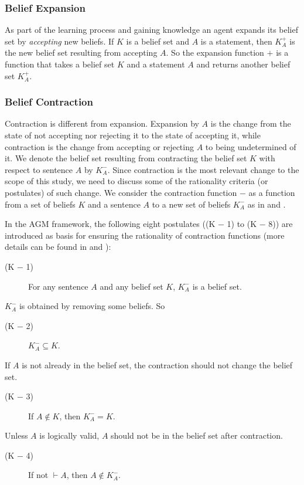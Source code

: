 \subsubsection{Belief Expansion}
As part of the learning process and gaining knowledge an agent expands its belief set by \textit{accepting} new beliefs. If $K$ is a belief set and $A$ is a statement, then $K^{+}_{A}$ is the new belief set resulting from accepting $A$. So the expansion function $+$ is a function that takes a belief set $K$ and a statement $A$ and returns another belief set $K^{+}_{A}$. 

\subsubsection{Belief Contraction}
Contraction is different from expansion. Expansion by $A$ is the change from the state of not accepting nor rejecting it to the state of accepting it, while contraction is the change from accepting or rejecting $A$ to being undetermined of it. We denote the belief set resulting from contracting the belief set $K$ with respect to sentence $A$ by $K^{-}_{A}$. Since contraction is the most relevant change to the scope of this study, we need to discuss some of the rationality criteria (or postulates) of such change. We consider the contraction function $-$ as a function from a set of beliefs $K$ and a sentence $A$ to a new set of beliefs $K^{-}_{A}$ as in \cite{flux} and \cite{kr}. 

In the AGM framework, the following eight postulates ((K $-$ 1) to (K $-$ 8)) are introduced as basis for ensuring the rationality of contraction functions (more details can be found in \cite{kr} and \cite{flux}):


\begin{description}
\item[(K $-$ 1)] For any sentence $A$ and any belief set $K$, $K^{-}_{A}$ is a belief set.
\end{description}
$K^{-}_{A}$ is obtained by removing some beliefs. So
\begin{description}
\item[(K $-$ 2)] $K^{-}_{A} \subseteq K$. 
\end{description}
If $A$ is not already in the belief set, the contraction should not change the belief set.
\begin{description}
\item[(K $-$ 3)] If $A \notin K$, then $K^{-}_{A} = K$. 
\end{description}
Unless $A$ is logically valid, $A$ should not be in the belief set after contraction.
\begin{description}
\item[(K $-$ 4)] If not $\vdash A$, then $A \notin K^{-}_{A}$. 
\end{description}


